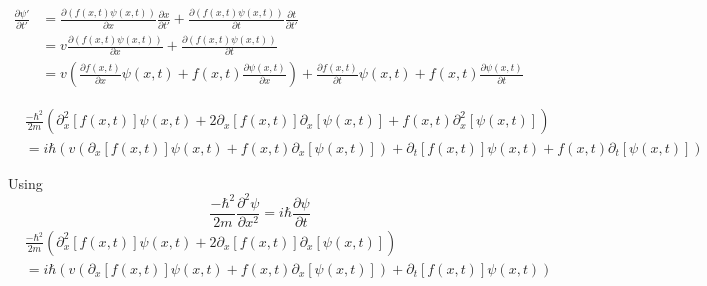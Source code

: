 \documentclass[12pt]{article}
\begin{document}
\begin{enumerate}
          \begin{equation*}
              \begin{split}
                  \frac{\partial \psi'}{\partial t'}
                   & = \frac{\partial (f(x,t)\psi(x,t))}{\partial x}\frac{\partial x}{\partial t'} +
                  \frac{\partial (f(x,t)\psi(x,t))}{\partial t}\frac{\partial t}{\partial t'}                                                                                                                              \\
                   & = v\frac{\partial (f(x,t)\psi(x,t))}{\partial x} +
                  \frac{\partial (f(x,t)\psi(x,t))}{\partial t}                                                                                                                                                            \\
                   & = v\left(\frac{\partial f(x,t)}{\partial x}\psi(x,t) + f(x,t)\frac{\partial \psi(x,t)}{\partial x}\right) + \frac{\partial f(x,t)}{\partial t}\psi(x,t) + f(x,t)\frac{\partial \psi(x,t)}{\partial t}
              \end{split}
          \end{equation*}

          \begin{equation*}
              \begin{split}
                   & \frac{-\hbar^2}{2m}
                  \left(\partial^2_x [f(x,t)]\psi(x,t) + 2\partial_x [f(x,t)]\partial_x[\psi(x,t)] + f(x,t)\partial^2_x[\psi(x,t)]\right)                                          \\
                   & = i\hbar \left(v\left(\partial_x [f(x,t)]\psi(x,t) + f(x,t)\partial_x [\psi(x,t)]\right) + \partial_t [f(x,t)]\psi(x,t) + f(x,t)\partial_t [\psi(x,t)]\right)
              \end{split}
          \end{equation*}

          Using \[\frac{-\hbar^2}{2m}\frac{\partial^2 \psi}{\partial x^2} = i\hbar \frac{\partial \psi}{\partial t} \]
          \begin{equation*}
              \begin{split}
                   & \frac{-\hbar^2}{2m}
                  \left(\partial^2_x [f(x,t)]\psi(x,t) + 2\partial_x [f(x,t)]\partial_x[\psi(x,t)] \right)                                          \\
                   & = i\hbar \left(v\left(\partial_x [f(x,t)]\psi(x,t) + f(x,t)\partial_x [\psi(x,t)]\right) + \partial_t [f(x,t)]\psi(x,t)\right)
              \end{split}
          \end{equation*}


\end{enumerate}
\end{document}
